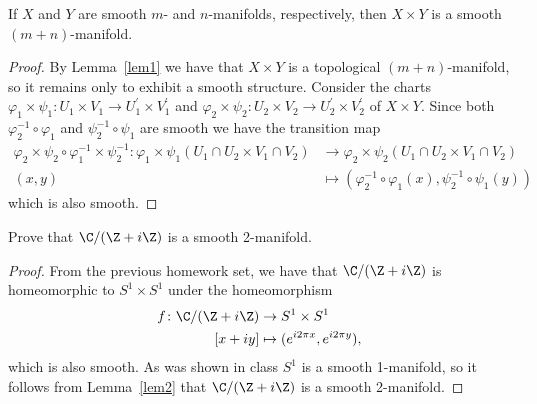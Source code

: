 \documentclass[10pt]{amsart}
\begin{document}
\begin{lem}\label{lem2}
	If $X$ and $Y$ are smooth $m$- and $n$-manifolds, respectively, then $X \times Y$ is a smooth $(m + n)$-manifold.
	\begin{proof}	
		By Lemma~\ref{lem1} we have that $X \times Y$ is a topological $(m + n)$-manifold, so it remains only to exhibit a smooth structure.
		Consider the charts $\varphi_1 \times \psi_1: U_1 \times V_1 \rightarrow U_1^\prime \times V_1^\prime$ and $\varphi_2 \times \psi_2 \colon U_2 \times V_2 \rightarrow U_2^\prime \times V_2 ^\prime$ of $X \times Y$.
		Since both $\varphi_2^{-1} \circ \varphi_1$ and $\psi_2^{-1} \circ \psi_1$ are smooth we have the transition map
		\begin{align*}
			\varphi_2 \times \psi_2 \circ \varphi_1^{-1} \times \psi_2^{-1} \colon \varphi_1 \times \psi_1(U_1 \cap U_2 \times V_1 \cap V_2) &\rightarrow \varphi_2 \times \psi_2(U_1 \cap U_2 \times V_1 \cap V_2)\\
			(x,y) &\mapsto \left(\varphi_2^{-1} \circ \varphi_1(x), \psi_2^{-1} \circ \psi_1(y)\right)
		\end{align*}
		which is also smooth.
	\end{proof}
\end{lem}

\begin{thm}\label{ex1}
  Prove that $\C/(\Z + i\Z)$ is a smooth 2-manifold.
  
  \begin{proof}
	From the previous homework set, we have that $\C/(\Z + i\Z)$ is homeomorphic to $S^1 \times S^1$ under the homeomorphism
	\begin{align*}
		f \colon \C/(\Z + i\Z) &\rightarrow S^1 \times S^1\\
		[x + iy] & \mapsto (e^{i2\pi x}, e^{i2\pi y}),
	\end{align*}
	which is also smooth.
	As was shown in class $S^1$ is a smooth 1-manifold, so it follows from Lemma~\ref{lem2} that $\C/(\Z+ i\Z)$ is a smooth 2-manifold.
  \end{proof}
\end{thm}
\end{document}
